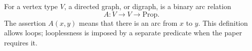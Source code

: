 \begin{definition}
For a vertex type \(V\), a directed graph, or digraph, is a binary arc relation
\[
  A\colon V\to V\to \mathrm{Prop}.
\]
The assertion \(A(x,y)\) means that there is an arc from \(x\) to \(y\).
This definition allows loops; looplessness is imposed by a separate predicate when the paper requires it.
\end{definition}
